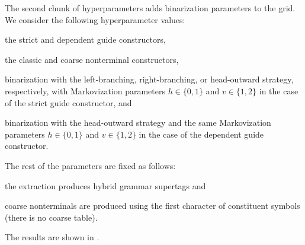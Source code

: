 \documentclass[../../document.tex]{subfiles}
\begin{document}
    The second chunk of hyperparameters adds binarization parameters to the grid.
    We consider the following hyperparameter values:
    \begin{compactitem}
        \item the strict and dependent guide constructors,
        \item the classic and coarse nonterminal constructors,
        \item binarization with the left-branching, right-branching, or head-outward strategy, respectively, with Markovization parameters \(h \in \{0,1\}\) and \(v \in \{1,2\}\) in the case of the strict guide constructor, and
        \item binarization with the head-outward strategy and the same Markovization parameters \(h \in \{0,1\}\) and \(v \in \{1,2\}\) in the case of the dependent guide constructor.
    \end{compactitem}
    The rest of the parameters are fixed as follows:
    \begin{compactitem}
        \item the extraction produces hybrid grammar supertags and
        \item coarse nonterminals are produced using the first character of constituent symbols (there is no coarse table).
    \end{compactitem}
    The results are shown in .
    
\end{document}
